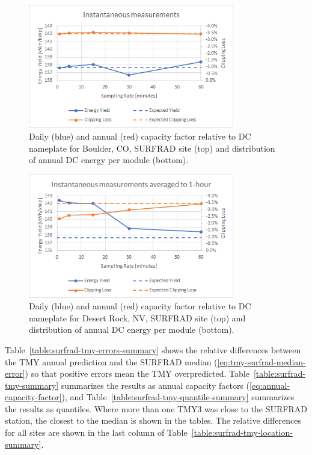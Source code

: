 \documentclass[conference]{IEEEtran}
\begin{document}
\begin{figure}[htbp]
\centerline{\includegraphics[width=9cm]{instantaneous.png}}
\caption{Daily (blue) and annual (red) capacity factor relative to DC nameplate for Boulder, CO, SURFRAD site (top) and distribution of annual DC energy per module (bottom).}
\label{fig:instantaneous}
\end{figure}

\begin{figure}[htbp]
\centerline{\includegraphics[width=9cm]{satellite-simulated.png}}
\caption{Daily (blue) and annual (red) capacity factor relative to DC nameplate for Desert Rock, NV, SURFRAD site (top) and distribution of annual DC energy per module (bottom).}
\label{fig:satellite-simulated}
\end{figure}

Table~\ref{table:surfrad-tmy-errors-summary} shows the relative differences between the TMY annual prediction and the SURFRAD median (\ref{eq:tmy-surfrad-median-error}) so that positive errors mean the TMY overpredicted. Table~\ref{table:surfrad-tmy-summary} summarizes the results as annual capacity factors (\ref{eq:annual-capacity-factor}), and Table~\ref{table:surfrad-tmy-quantile-summary} summarizes the results as quantiles. Where more than one TMY3 was close to the SURFRAD station, the closest to the median is shown in the tables. The relative differences for all sites are shown in the last column of Table~\ref{table:surfrad-tmy-location-summary}.
\end{document}
